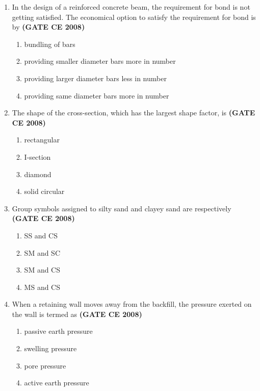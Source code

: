 \documentclass[journal]{IEEEtran}
\begin{document}
\begin{enumerate}
\item In the design of a reinforced concrete beam, the requirement for bond is not getting satisfied. The economical option to satisfy the requirement for bond is by  \textbf{(GATE CE 2008)}

\begin{enumerate}
\item bundling of bars 
\item providing smaller diameter bars more in number 
\item  providing larger diameter bars less in number 
\item providing same diameter bars more in number
\end{enumerate}


\item The shape of the cross-section, which has the largest shape factor, is  \textbf{(GATE CE 2008)}

\begin{multicols}{2}
\begin{enumerate}
\item rectangular
\item  I-section
\item  diamond
\item solid circular
\end{enumerate}
\end{multicols}




\item  Group symbols assigned to silty sand and clayey sand are respectively  \textbf{(GATE CE 2008)}
\begin{multicols}{4}
\begin{enumerate}
\item SS and CS
\item  SM and SC
\item SM and CS
\item MS and CS
\end{enumerate}
\end{multicols}

\item When a retaining wall moves away from the backfill, the pressure exerted on the wall is termed as \textbf{(GATE CE 2008)}


\begin{enumerate}
\item passive earth pressure
\item swelling pressure
\item pore pressure
\item active earth pressure
\end{enumerate}



\end{enumerate}
\end{document}
